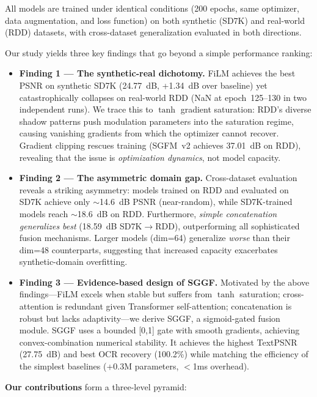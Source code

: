 \documentclass[11pt]{article}
\begin{document}
All models are trained under identical conditions (200 epochs, same optimizer, data augmentation, and loss function) on both synthetic (SD7K) and real-world (RDD) datasets, with cross-dataset generalization evaluated in both directions.

Our study yields three key findings that go beyond a simple performance ranking:

\begin{itemize}
  \item \textbf{Finding 1 — The synthetic-real dichotomy.} FiLM achieves the best PSNR on synthetic SD7K (24.77~dB, +1.34~dB over baseline) yet catastrophically collapses on real-world RDD (NaN at epoch~125--130 in two independent runs). We trace this to $\tanh$ gradient saturation: RDD's diverse shadow patterns push modulation parameters into the saturation regime, causing vanishing gradients from which the optimizer cannot recover. Gradient clipping rescues training (SGFM~v2 achieves 37.01~dB on RDD), revealing that the issue is \textit{optimization dynamics}, not model capacity.

  \item \textbf{Finding 2 — The asymmetric domain gap.} Cross-dataset evaluation reveals a striking asymmetry: models trained on RDD and evaluated on SD7K achieve only $\sim$14.6~dB PSNR (near-random), while SD7K-trained models reach $\sim$18.6~dB on RDD. Furthermore, \textit{simple concatenation generalizes best} (18.59~dB SD7K$\rightarrow$RDD), outperforming all sophisticated fusion mechanisms. Larger models (dim=64) generalize \textit{worse} than their dim=48 counterparts, suggesting that increased capacity exacerbates synthetic-domain overfitting.

  \item \textbf{Finding 3 — Evidence-based design of SGGF.} Motivated by the above findings---FiLM excels when stable but suffers from $\tanh$ saturation; cross-attention is redundant given Transformer self-attention; concatenation is robust but lacks adaptivity---we derive SGGF, a sigmoid-gated fusion module. SGGF uses a bounded [0,1] gate with smooth gradients, achieving convex-combination numerical stability. It achieves the highest TextPSNR (27.75~dB) and best OCR recovery (100.2\%) while matching the efficiency of the simplest baselines (+0.3M parameters, $<$1ms overhead).
\end{itemize}

\textbf{Our contributions} form a three-level pyramid:
\end{document}
